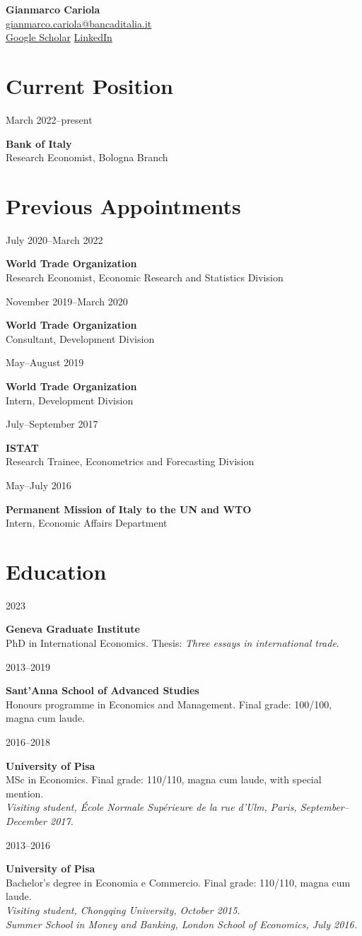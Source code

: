 \documentclass[11pt,a4paper]{article}
\newcommand{\entry}[3]{\noindent\begin{minipage}[t]{0.26\linewidth}\small #2\end{minipage}\hfill\begin{minipage}[t]{0.71\linewidth}\textbf{#1}\\#3\end{minipage}\par\medskip}
\begin{document}
{\LARGE\bfseries Gianmarco Cariola}\\[6pt]
\href{mailto:gianmarco.cariola@bancaditalia.it}{gianmarco.cariola@bancaditalia.it}\\
\href{https://scholar.google.com/citations?user=WukcVpAAAAAJ}{Google Scholar}\quad
\href{https://www.linkedin.com/in/gianmarco-cariola-45314b128}{LinkedIn}

\section*{Current Position}
\entry{Bank of Italy}{March 2022--present}{Research Economist, Bologna Branch}
\section*{Previous Appointments}
\entry{World Trade Organization}{July 2020--March 2022}{Research Economist, Economic Research and Statistics Division}
\entry{World Trade Organization}{November 2019--March 2020}{Consultant, Development Division}
\entry{World Trade Organization}{May--August 2019}{Intern, Development Division}
\entry{ISTAT}{July--September 2017}{Research Trainee, Econometrics and Forecasting Division}
\entry{Permanent Mission of Italy to the UN and WTO}{May--July 2016}{Intern, Economic Affairs Department}


\section*{Education}
\entry{Geneva Graduate Institute}{2023}{PhD in International Economics. Thesis: \emph{Three essays in international trade}.}
\entry{Sant'Anna School of Advanced Studies}{2013--2019}{Honours programme in Economics and Management. Final grade: 100/100, magna cum laude.}
\entry{University of Pisa}{2016--2018}{MSc in Economics. Final grade: 110/110, magna cum laude, with special mention.\\[4pt]
\emph{Visiting student, \'Ecole Normale Sup\'erieure de la rue d'Ulm, Paris, September--December 2017.}}
\entry{University of Pisa}{2013--2016}{Bachelor's degree in Economia e Commercio. Final grade: 110/110, magna cum laude.\\[4pt]
\emph{Visiting student, Chongqing University, October 2015.}\\[4pt]
\emph{Summer School in Money and Banking, London School of Economics, July 2016.}}
\end{document}
